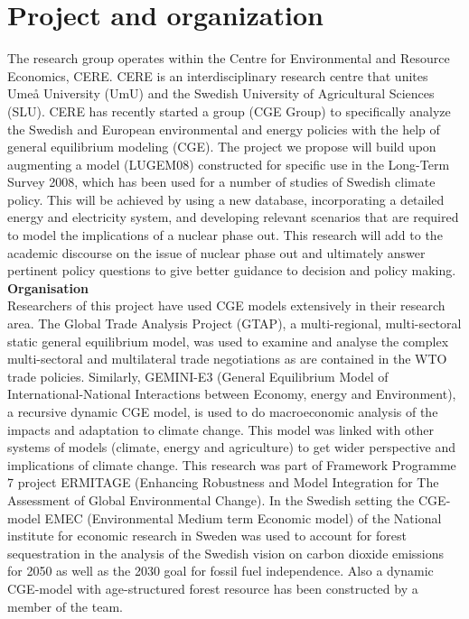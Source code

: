 \section{Project and organization}
The research group operates within the Centre for Environmental and Resource Economics, CERE. CERE is an interdisciplinary research centre that unites Umeå University (UmU) and the Swedish University of Agricultural Sciences (SLU). CERE has recently started a group (CGE Group) to specifically analyze the Swedish and European environmental and energy policies with the help of general equilibrium modeling (CGE). The project we propose will build upon augmenting a model (LUGEM08) constructed for specific use in the Long-Term Survey 2008, which has been used for a number of studies of Swedish climate policy. This will be achieved by using a new database, incorporating a detailed energy and electricity system, and developing relevant scenarios that are required to model the implications of a nuclear phase out. This research will add to the academic discourse on the issue of nuclear phase out and ultimately answer pertinent policy questions to give better guidance to decision and policy making.\\

\textbf{Organisation}\\
Researchers of this project have used CGE models extensively in their research area. The Global Trade Analysis Project (GTAP), a multi-regional, multi-sectoral static general equilibrium model, was used to examine and analyse the complex multi-sectoral and multilateral trade negotiations as are contained in the WTO trade policies. Similarly, GEMINI-E3 (General Equilibrium Model of International-National Interactions between Economy, energy and Environment), a recursive dynamic CGE model, is used to do macroeconomic analysis of the impacts and adaptation to climate change. This model was linked with other systems of models (climate, energy and agriculture) to get wider perspective and implications of climate change. This research was part of Framework Programme 7 project ERMITAGE (Enhancing Robustness and Model Integration for The Assessment of Global Environmental Change). In the Swedish setting the CGE-model EMEC (Environmental Medium term Economic model) of the National institute for economic research in Sweden was used to account for forest sequestration in the analysis of the Swedish vision on carbon dioxide emissions for 2050 as well as the 2030 goal for fossil fuel independence. Also a dynamic CGE-model with age-structured forest resource \citep{furtenback2011three} has been constructed by a member of the team.\\

